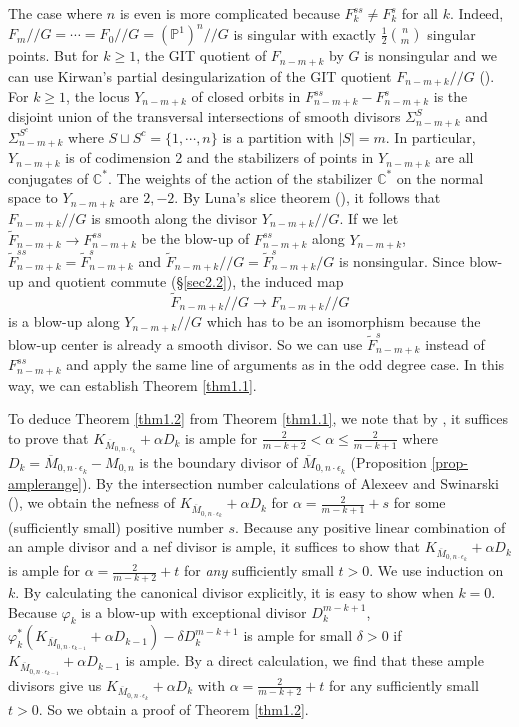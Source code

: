 \documentclass[10pt]{amsart}
\theoremstyle{definition}
\newcommand{\PP}{\mathbb{P}}
\newcommand{\CC}{\mathbb{C}}
\def\Mzek{\overline{M}_{0,n\cdot \epsilon_k} }
\def\Mzeko{\overline{M}_{0,n\cdot \epsilon_{k-1}} }
\def\git{/\!/ }
\begin{document}
\def\Fk{F_{n-m+k} }
\def\tFk{\tilde{F}_{n-m+k} }
\def\Yk{Y_{n-m+k} }

The case where $n$ is even is more complicated because
$F_k^{ss}\ne F_k^s$ for all $k$. Indeed, $F_m\git G=\cdots
=F_0\git G= (\PP^1)^n\git G$ is singular with exactly
$\frac12\binom{n}{m}$ singular points. But for $k\ge 1$, the GIT
quotient of $F_{n-m+k}$ by $G$ is nonsingular and we can use
Kirwan's partial desingularization of the GIT quotient
$F_{n-m+k}\git G$ (\cite{Kirwan}). For $k\ge 1$, the locus
$Y_{n-m+k}$ of closed orbits in $F_{n-m+k}^{ss}-F_{n-m+k}^s$ is
the disjoint union of the transversal intersections of smooth
divisors $\Sigma^S_{n-m+k}$ and $\Sigma^{S^c}_{n-m+k}$ where
$S\sqcup S^c=\{1,\cdots,n\}$ is a partition with $|S|=m$. In
particular, $Y_{n-m+k}$ is of codimension $2$ and the stabilizers
of points in $Y_{n-m+k}$ are all conjugates of $\CC^*$. The
weights of the action of the stabilizer $\CC^*$ on the normal
space to $Y_{n-m+k}$ are $2,-2$. By Luna's slice theorem
(\cite[Appendix 1.D]{MFK}), it follows that $F_{n-m+k}\git G$ is
smooth along the divisor $Y_{n-m+k}\git G$. If we let $\tFk\to
\Fk^{ss}$ be the blow-up of $\Fk^{ss}$ along $\Yk$,
$\tFk^{ss}=\tFk^s$ and $\tFk\git G=\tFk^s/G$ is nonsingular. Since
blow-up and quotient commute (\S\ref{sec2.2}), the induced map
$$\tFk\git G\to \Fk\git G$$ is a blow-up along $\Yk\git G$ which has
to be an isomorphism because the blow-up center is already a smooth
divisor. So we can use $\tFk^s$ instead of $\Fk^{ss}$ and apply the
same line of arguments as in the odd degree case. In this way, we
can establish Theorem \ref{thm1.1}.



To deduce Theorem \ref{thm1.2} from Theorem \ref{thm1.1}, we note
that by \cite[Corollary 3.5]{Simpson}, it suffices to prove that
$K_{\Mzek}+\alpha D_k$ is ample for $\frac{2}{m-k+2}<\alpha\le
\frac{2}{m-k+1}$ where $D_k=\Mzek-M_{0,n}$ is the boundary divisor
of $\Mzek$ (Proposition \ref{prop-amplerange}). By the
intersection number calculations of Alexeev and Swinarski
(\cite[\S3]{AlexSwin}), we obtain the nefness of $K_{\Mzek}+\alpha
D_k$ for $\alpha= \frac{2}{m-k+1}+s$ for some (sufficiently small)
positive number $s$. Because any positive linear combination of an
ample divisor and a nef divisor is ample, it suffices to show that
$K_{\Mzek}+\alpha D_k$ is ample for $\alpha=\frac{2}{m-k+2}+t$ for
\emph{any} sufficiently small $t>0$. We use induction on $k$. By
calculating the canonical divisor explicitly, it is easy to show
when $k=0$. Because $\varphi_k$ is a blow-up with exceptional
divisor $D^{m-k+1}_k$, $\varphi_k^*(K_{\Mzeko}+\alpha
D_{k-1})-\delta D^{m-k+1}_k$ is ample for small $\delta>0$ if
$K_{\Mzeko}+\alpha D_{k-1}$ is ample. By a direct calculation, we
find that these ample divisors give us $K_{\Mzek}+\alpha D_k$ with
$\alpha=\frac{2}{m-k+2}+t$ for any sufficiently small $t>0$. So we
obtain a proof of Theorem \ref{thm1.2}.
\end{document}
